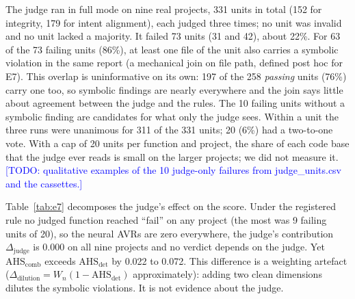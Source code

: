 \documentclass[10pt,a4paper]{article}
\newcommand{\todo}[1]{\textcolor{blue}{[TODO: #1]}}
\begin{document}
The judge ran in full mode on nine real projects, 331 units in total (152 for integrity, 179 for intent alignment),
each judged three times; no unit was invalid and no unit lacked a majority. It failed 73 units (31 and 42), about 22\%.
For 63 of the 73 failing units (86\%), at least one file of the unit also carries a symbolic violation in the same
report (a mechanical join on file path, defined post hoc for E7). This overlap is uninformative on its own: 197 of
the 258 \emph{passing} units (76\%) carry one too, so symbolic findings are nearly everywhere and the join says
little about agreement between the judge and the rules. The 10 failing units without a symbolic finding are
candidates for what only the judge sees.
Within a unit the three runs were unanimous for 311 of the 331 units; 20 (6\%) had a two-to-one vote.
With a cap of 20 units per function and project, the share of each code base that the judge ever reads is small on
the larger projects; we did not measure it.
\todo{qualitative examples of the 10 judge-only failures from judge\_units.csv and the cassettes.}

Table~\ref{tab:e7} decomposes the judge's effect on the score. Under the registered rule no judged function reached
``fail'' on any project (the most was 9 failing units of 20), so the neural AVRs are zero everywhere, the judge's
contribution $\Delta_\mathrm{judge}$ is 0.000 on all nine projects and no verdict depends on the judge. Yet
$\mathrm{AHS}_\mathrm{comb}$ exceeds $\mathrm{AHS}_\mathrm{det}$ by 0.022 to 0.072. This difference is a weighting
artefact ($\Delta_\mathrm{dilution} = W_n(1 - \mathrm{AHS}_\mathrm{det})$ approximately): adding two clean
dimensions dilutes the symbolic violations. It is not evidence about the judge.
\end{document}
